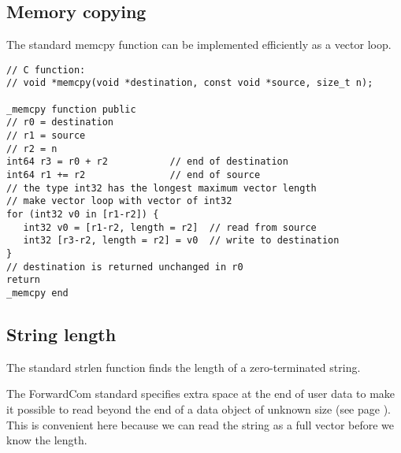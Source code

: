 \documentclass[forwardcom.tex]{subfiles}
\begin{document}
\subsection{Memory copying} \label{memcpy}
The standard memcpy function can be implemented efficiently as a vector loop.

\begin{example}
\label{exampleMemcpy}
\end{example}
\begin{lstlisting}[frame=single]
// C function:
// void *memcpy(void *destination, const void *source, size_t n);

_memcpy function public
// r0 = destination
// r1 = source
// r2 = n
int64 r3 = r0 + r2           // end of destination
int64 r1 += r2               // end of source
// the type int32 has the longest maximum vector length
// make vector loop with vector of int32
for (int32 v0 in [r1-r2]) {
   int32 v0 = [r1-r2, length = r2]  // read from source
   int32 [r3-r2, length = r2] = v0  // write to destination
}
// destination is returned unchanged in r0
return
_memcpy end   
\end{lstlisting}
\vspace{4mm}


\subsection{String length} \label{strlen}
The standard strlen function finds the length of a zero-terminated string.
\vspace{2mm}

The ForwardCom standard specifies extra space at the end of user data to make it possible to read beyond the end of a data object of unknown size (see page \pageref{extraSpaceAtEndOfData}). This is convenient here because we can read the string as a full vector before we know the length.
\end{document}
